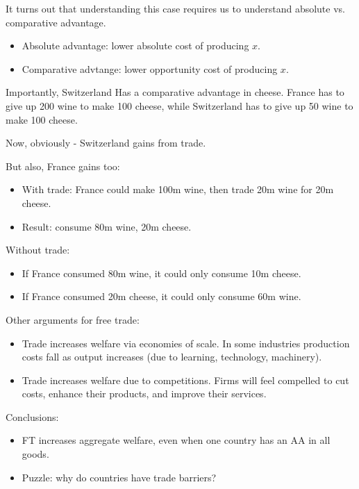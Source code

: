 \documentclass{article}
\begin{document}
It turns out that understanding this case requires us to understand absolute vs. comparative advantage.

\begin{itemize}
  \item Absolute advantage: lower absolute cost of producing $x$.
  \item Comparative advtange: lower opportunity cost of producing $x$.
\end{itemize}

Importantly, Switzerland Has a comparative advantage in cheese.  France has to give up 200 wine to make 100 cheese, while Switzerland has to give up 50 wine to make 100 cheese.

Now, obviously - Switzerland gains from trade.

But also, France gains too:
\begin{itemize}
  \item With trade: France could make 100m wine, then trade 20m wine for 20m cheese.
  \item Result: consume 80m wine, 20m cheese.
\end{itemize}

Without trade:
\begin{itemize}
  \item If France consumed 80m wine, it could only consume 10m cheese.
  \item If France consumed 20m cheese, it could only consume 60m wine.
\end{itemize}


Other arguments for free trade:

\begin{itemize}
  \item Trade increases welfare via economies of scale.  In some industries production costs fall as output increases (due to learning, technology, machinery).
  \item Trade increases welfare due to competitions.  Firms will feel compelled to cut costs, enhance their products, and improve their services.
\end{itemize}

Conclusions:

\begin{itemize}
  \item FT increases aggregate welfare, even when one country has an AA in all goods.
  \item Puzzle: why do countries have trade barriers?
\end{itemize}
\end{document}
